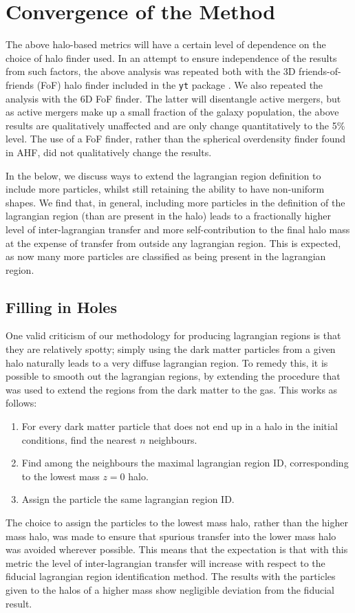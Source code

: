 \section{Convergence of the Method}
\label{sec:convergence}

The above halo-based metrics will have a certain level of dependence on the
choice of halo finder used. In an attempt to ensure independence of the results
from such factors, the above analysis was repeated both with the 3D
friends-of-friends (FoF) halo finder included in the {\tt yt} package \citep{Turk2011}.
We also repeated the analysis with the \velociraptor{} 6D FoF finder.
The latter will disentangle active mergers, but as active mergers make up a small
fraction of the galaxy population, the above results are qualitatively
unaffected and are only change quantitatively to the 5\% level.
The use of a FoF finder, rather than the spherical overdensity finder found
in AHF, did not qualitatively change the results.

In the below, we discuss ways to extend the lagrangian region definition to include
more particles, whilst still retaining the ability to have non-uniform shapes. We
find that, in general, including more particles in the definition of the lagrangian
region (than are present in the halo) leads to a fractionally higher level
of inter-lagrangian transfer and more self-contribution to the final halo mass
at the expense of transfer from outside any lagrangian region. This is expected, as
now many more particles are classified as being present in the lagrangian region.


\subsection{Filling in Holes}


One valid criticism of our methodology for producing lagrangian regions is that
they are relatively spotty; simply using the dark matter particles from a given
halo naturally leads to a very diffuse lagrangian region. To remedy this, it is
possible to smooth out the lagrangian regions, by extending the procedure
that was used to extend the regions from the dark matter to the gas.
This works as follows:
\begin{enumerate}
	\item For every dark matter particle that does not end up in a halo 
	      in the initial conditions, find the nearest $n$ neighbours.
	\item Find among the neighbours the maximal lagrangian region ID,
	      corresponding to the lowest mass $z=0$ halo.
	\item Assign the particle the same lagrangian region ID.
\end{enumerate}
The choice to assign the particles to the lowest mass halo, rather than the
higher mass halo, was made to ensure that spurious transfer into the lower mass
halo was avoided wherever possible. This means that the expectation is that
with this metric the level of inter-lagrangian transfer will increase with
respect to the fiducial lagrangian region identification method. The results
with the particles given to the halos of a higher mass show negligible
deviation from the fiducial result.

